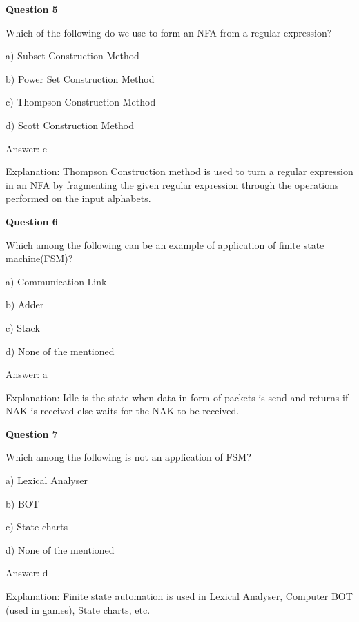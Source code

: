 \documentclass{article}
\begin{document}
\begin{mdframed}[linewidth=1pt, roundcorner=5pt, linecolor=gray!30, backgroundcolor=gray!5]
\textbf{Question 5} 

Which of the following do we use to form an NFA from a regular expression?

a) Subset Construction Method

b) Power Set Construction Method

c) Thompson Construction Method

d) Scott Construction Method
\vspace{5pt} \par
\begin{tcolorbox}[colback=green!5, colframe=green!40!black, title=Solution]
Answer: c

Explanation: Thompson Construction method is used to turn a regular expression in an NFA by fragmenting the given regular expression through the operations performed on the input alphabets.

\end{tcolorbox}
\end{mdframed}

\begin{mdframed}[linewidth=1pt, roundcorner=5pt, linecolor=gray!30, backgroundcolor=gray!5]
\textbf{Question 6} 

Which among the following can be an example of application of finite state machine(FSM)?

a) Communication Link

b) Adder

c) Stack

d) None of the mentioned
\vspace{5pt} \par
\begin{tcolorbox}[colback=green!5, colframe=green!40!black, title=Solution]
Answer: a

Explanation: Idle is the state when data in form of packets is send and returns if NAK is received else waits for the NAK to be received.
\end{tcolorbox}
\end{mdframed}
\newpage

\begin{mdframed}[linewidth=1pt, roundcorner=5pt, linecolor=gray!30, backgroundcolor=gray!5]
\textbf{Question 7} 

Which among the following is not an application of FSM?

a) Lexical Analyser

b) BOT

c) State charts

d) None of the mentioned
\vspace{5pt} \par
\begin{tcolorbox}[colback=green!5, colframe=green!40!black, title=Solution]
Answer: d

Explanation: Finite state automation is used in Lexical Analyser, Computer BOT (used in games), State charts, etc.
\end{tcolorbox}
\end{mdframed}
\end{document}
